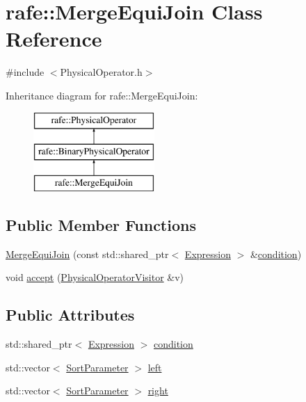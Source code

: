 \hypertarget{classrafe_1_1_merge_equi_join}{\section{rafe\+:\+:Merge\+Equi\+Join Class Reference}
\label{classrafe_1_1_merge_equi_join}
}


{\ttfamily \#include $<$Physical\+Operator.\+h$>$}

Inheritance diagram for rafe\+:\+:Merge\+Equi\+Join\+:\begin{figure}[H]
\begin{center}
\leavevmode
\includegraphics[height=3.000000cm]{classrafe_1_1_merge_equi_join}
\end{center}
\end{figure}
\subsection*{Public Member Functions}
\begin{DoxyCompactItemize}
\item 
\hyperlink{classrafe_1_1_merge_equi_join_ab51232a08c11f2f8402fffeafa7b4ea5}{Merge\+Equi\+Join} (const std\+::shared\+\_\+ptr$<$ \hyperlink{classrafe_1_1_expression}{Expression} $>$ \&\hyperlink{classrafe_1_1_merge_equi_join_a7b3cbe4e5b568582281f89de0eee0460}{condition})
\item 
void \hyperlink{classrafe_1_1_merge_equi_join_a612f15e10eb741126e282b605fef0921}{accept} (\hyperlink{classrafe_1_1_physical_operator_visitor}{Physical\+Operator\+Visitor} \&v)
\end{DoxyCompactItemize}
\subsection*{Public Attributes}
\begin{DoxyCompactItemize}
\item 
std\+::shared\+\_\+ptr$<$ \hyperlink{classrafe_1_1_expression}{Expression} $>$ \hyperlink{classrafe_1_1_merge_equi_join_a7b3cbe4e5b568582281f89de0eee0460}{condition}
\item 
std\+::vector$<$ \hyperlink{classrafe_1_1_sort_parameter}{Sort\+Parameter} $>$ \hyperlink{classrafe_1_1_merge_equi_join_adff0e135df404e746d1ddfac4ac25a8d}{left}
\item 
std\+::vector$<$ \hyperlink{classrafe_1_1_sort_parameter}{Sort\+Parameter} $>$ \hyperlink{classrafe_1_1_merge_equi_join_a3d77a9923ebd3aafe2aaf87fdf81bf6e}{right}
\end{DoxyCompactItemize}


